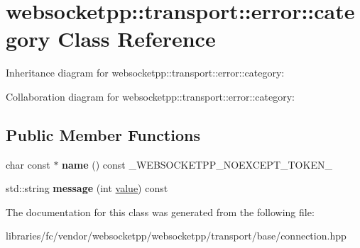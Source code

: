 \hypertarget{classwebsocketpp_1_1transport_1_1error_1_1category}{}\section{websocketpp\+:\+:transport\+:\+:error\+:\+:category Class Reference}
\label{classwebsocketpp_1_1transport_1_1error_1_1category}


Inheritance diagram for websocketpp\+:\+:transport\+:\+:error\+:\+:category\+:


Collaboration diagram for websocketpp\+:\+:transport\+:\+:error\+:\+:category\+:
\subsection*{Public Member Functions}
\begin{DoxyCompactItemize}
\item 
\mbox{\label{classwebsocketpp_1_1transport_1_1error_1_1category_a326b11bd1d14a180089f0562e18c3426}} 
char const  $\ast$ {\bfseries name} () const \+\_\+\+W\+E\+B\+S\+O\+C\+K\+E\+T\+P\+P\+\_\+\+N\+O\+E\+X\+C\+E\+P\+T\+\_\+\+T\+O\+K\+E\+N\+\_\+
\item 
\mbox{\label{classwebsocketpp_1_1transport_1_1error_1_1category_aa45247642bb827a91491da22d9e8d07c}} 
std\+::string {\bfseries message} (int \mbox{\hyperlink{namespacewebsocketpp_1_1transport_1_1error_a8d371a2562d813e5a2e106e2694d4fb0}{value}}) const
\end{DoxyCompactItemize}


The documentation for this class was generated from the following file\+:\begin{DoxyCompactItemize}
\item 
libraries/fc/vendor/websocketpp/websocketpp/transport/base/connection.\+hpp\end{DoxyCompactItemize}
